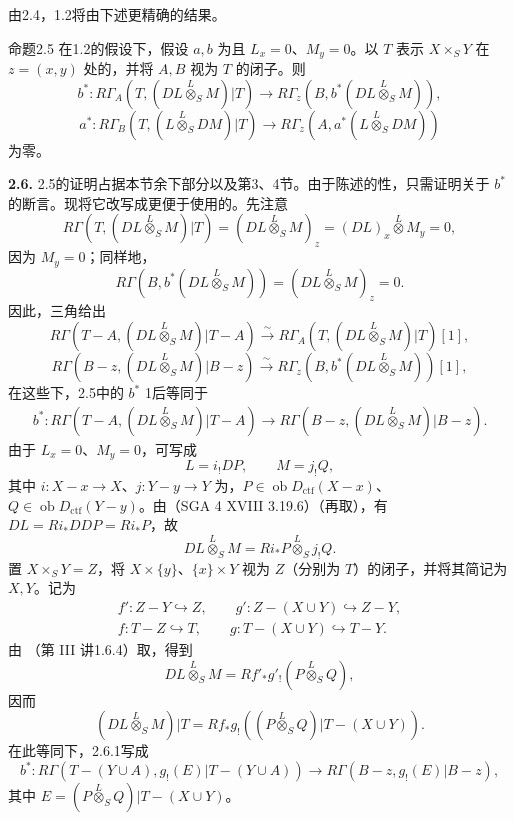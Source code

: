 由2.4，1.2将由下述更精确的结果。
\begin{SGAresult}{命题}{2.5}
在1.2的假设下，假设 $a,b$ 为且 $L_x=0$、$M_y=0$。以 $T$ 表示 $X\times_S Y$ 在 $z=(x,y)$ 处的，并将 $A,B$ 视为 $T$ 的闭子。则
\[
 b^*:R\Gamma_A(T,(DL\overset L\otimes_S M)|T)\longrightarrow
 R\Gamma_z(B,b^*(DL\overset L\otimes_S M)),
\]
\[
 a^*:R\Gamma_B(T,(L\overset L\otimes_S DM)|T)\longrightarrow
 R\Gamma_z(A,a^*(L\overset L\otimes_S DM))
\]
为零。
\end{SGAresult}
\textbf{2.6.} 2.5的证明占据本节余下部分以及第3、4节。由于陈述的性，只需证明关于 $b^*$ 的断言。现将它改写成更便于使用的。先注意
\[
 R\Gamma(T,(DL\overset L\otimes_S M)|T)
 =(DL\overset L\otimes_S M)_z=(DL)_x\overset L\otimes M_y=0,
\]
因为 $M_y=0$；同样地，
\[
 R\Gamma(B,b^*(DL\overset L\otimes_S M))=(DL\overset L\otimes_S M)_z=0.
\]
因此，三角给出
\[
 R\Gamma(T-A,(DL\overset L\otimes_S M)|T-A)
 \xrightarrow{\sim}R\Gamma_A(T,(DL\overset L\otimes_S M)|T)[1],
\]
\[
 R\Gamma(B-z,(DL\overset L\otimes_S M)|B-z)
 \xrightarrow{\sim}R\Gamma_z(B,b^*(DL\overset L\otimes_S M))[1],
\]
在这些下，2.5中的 $b^*$ 1后等同于
\[
 \begin{aligned}
 b^*:R\Gamma(T-A,(DL\overset L\otimes_S M)|T-A)
 \longrightarrow R\Gamma(B-z,(DL\overset L\otimes_S M)|B-z).
 \end{aligned}\tag{2.6.1}
\]
由于 $L_x=0$、$M_y=0$，可写成
\[
 L=i_!DP,\qquad M=j_!Q,\tag{2.6.2}
\]
其中 $i:X-x\to X$、$j:Y-y\to Y$ 为，$P\in\operatorname{ob}D_{\mathrm{ctf}}(X-x)$、$Q\in\operatorname{ob}D_{\mathrm{ctf}}(Y-y)$。由（SGA 4 XVIII 3.19.6）（再取），有 $DL=Ri_*DDP=Ri_*P$，故
\[
 DL\overset L\otimes_S M=Ri_*P\overset L\otimes_S j_!Q.
\]
置 $X\times_S Y=Z$，将 $X\times\{y\}$、$\{x\}\times Y$ 视为 $Z$（分别为 $T$）的闭子，并将其简记为 $X,Y$。记为
\[
 \begin{gathered}
 f':Z-Y\hookrightarrow Z,\qquad g':Z-(X\cup Y)\hookrightarrow Z-Y,\\
 f:T-Z\hookrightarrow T,\qquad g:T-(X\cup Y)\hookrightarrow T-Y.
 \end{gathered}
\]
由 （第 III 讲1.6.4）取，得到
\[
 DL\overset L\otimes_S M=Rf'_*g'_!(P\overset L\otimes_S Q),
\]
因而
\[
 (DL\overset L\otimes_S M)|T
 =Rf_*g_!((P\overset L\otimes_S Q)|T-(X\cup Y)).\tag{2.6.3}
\]
在此等同下，2.6.1写成
\[
 b^*:R\Gamma(T-(Y\cup A),g_!(E)|T-(Y\cup A))
 \longrightarrow R\Gamma(B-z,g_!(E)|B-z),\tag{2.6.4}
\]
其中 $E=(P\overset L\otimes_S Q)|T-(X\cup Y)$。

